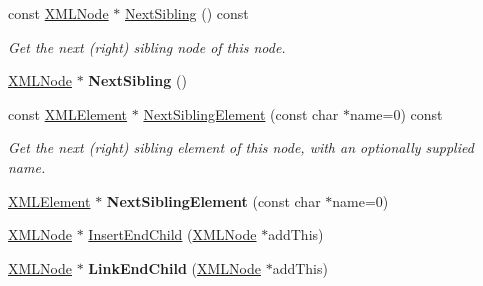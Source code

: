 \begin{DoxyCompactItemize}
\item 
\hypertarget{classtinyxml2_1_1_x_m_l_node_abba1df37581d89dccc45acdc55750ba2}{}const \hyperlink{classtinyxml2_1_1_x_m_l_node}{X\+M\+L\+Node} $\ast$ \hyperlink{classtinyxml2_1_1_x_m_l_node_abba1df37581d89dccc45acdc55750ba2}{Next\+Sibling} () const \label{classtinyxml2_1_1_x_m_l_node_abba1df37581d89dccc45acdc55750ba2}

\begin{DoxyCompactList}\small\item\em Get the next (right) sibling node of this node. \end{DoxyCompactList}\item 
\hypertarget{classtinyxml2_1_1_x_m_l_node_aeb7d4dfd8fb924ef86e7cb72183acbac}{}\hyperlink{classtinyxml2_1_1_x_m_l_node}{X\+M\+L\+Node} $\ast$ {\bfseries Next\+Sibling} ()\label{classtinyxml2_1_1_x_m_l_node_aeb7d4dfd8fb924ef86e7cb72183acbac}

\item 
\hypertarget{classtinyxml2_1_1_x_m_l_node_ab66a0818d72cee86e0952ed2da701f8b}{}const \hyperlink{classtinyxml2_1_1_x_m_l_element}{X\+M\+L\+Element} $\ast$ \hyperlink{classtinyxml2_1_1_x_m_l_node_ab66a0818d72cee86e0952ed2da701f8b}{Next\+Sibling\+Element} (const char $\ast$name=0) const \label{classtinyxml2_1_1_x_m_l_node_ab66a0818d72cee86e0952ed2da701f8b}

\begin{DoxyCompactList}\small\item\em Get the next (right) sibling element of this node, with an optionally supplied name. \end{DoxyCompactList}\item 
\hypertarget{classtinyxml2_1_1_x_m_l_node_af1225412584d4a2126f55e96a12e0ec0}{}\hyperlink{classtinyxml2_1_1_x_m_l_element}{X\+M\+L\+Element} $\ast$ {\bfseries Next\+Sibling\+Element} (const char $\ast$name=0)\label{classtinyxml2_1_1_x_m_l_node_af1225412584d4a2126f55e96a12e0ec0}

\item 
\hyperlink{classtinyxml2_1_1_x_m_l_node}{X\+M\+L\+Node} $\ast$ \hyperlink{classtinyxml2_1_1_x_m_l_node_ae3b422e98914d6002ca99bb1d2837103}{Insert\+End\+Child} (\hyperlink{classtinyxml2_1_1_x_m_l_node}{X\+M\+L\+Node} $\ast$add\+This)
\item 
\hypertarget{classtinyxml2_1_1_x_m_l_node_a663e3a5a378169fd477378f4d17a7649}{}\hyperlink{classtinyxml2_1_1_x_m_l_node}{X\+M\+L\+Node} $\ast$ {\bfseries Link\+End\+Child} (\hyperlink{classtinyxml2_1_1_x_m_l_node}{X\+M\+L\+Node} $\ast$add\+This)\label{classtinyxml2_1_1_x_m_l_node_a663e3a5a378169fd477378f4d17a7649}


\end{DoxyCompactItemize}
